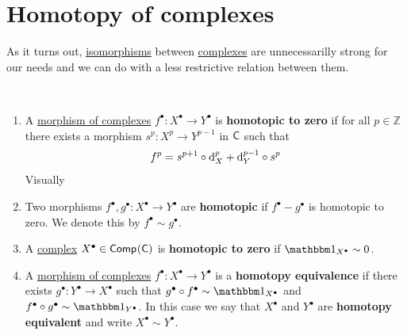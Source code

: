 \documentclass[../../main]{subfiles}
\begin{document}
\section{Homotopy of complexes}

As it turns out, \hyperref[def:categorical-isomorphism]{isomorphisms} between \hyperref[def:complex]{complexes} are unnecessarilly strong for our needs and we can do with a less restrictive relation between them.
\begin{definition}[Homotopy]\label{def:homotopy}~
  \begin{enumerate}
    \item A \hyperref[def:complex]{morphism of complexes} \(f^{\bullet}\colon X^{\bullet} \to Y^{\bullet}\) is \textbf{homotopic to zero} if for all \(p \in \mathbb{Z}\) there exists a morphism \(s^{p}\colon X^{p} \to Y^{p-1}\) in \(\mathsf{C}\) such that
          \begin{equation*}
            f^{p} = s^{p+1} \circ \mathrm{d}_{X}^{p} + \mathrm{d}_{Y}^{p-1} \circ s^{p}
          \end{equation*}
          Visually
          \begin{center}
          \end{center}
    \item Two morphisms \(f^{\bullet}, g^{\bullet}\colon X^{\bullet} \to Y^{\bullet}\) are \textbf{homotopic} if \(f^{\bullet}-g^{\bullet}\) is homotopic to zero.
          We denote this by \(f^{\bullet} \sim g^{\bullet}\).
    \item A \hyperref[def:complex]{complex} \(X^{\bullet} \in \mathsf{Comp}^{}(\mathsf{C})\) is \textbf{homotopic to zero} if \(\id_{X^{\bullet}} \sim 0\).
    \item A \hyperref[def:complex]{morphism of complexes} \(f^{\bullet}\colon X^{\bullet} \to Y^{\bullet}\) is a \textbf{homotopy equivalence} if there exists \(g^{\bullet}\colon Y^{\bullet} \to X^{\bullet}\) such that \(g^{\bullet} \circ f^{\bullet} \sim \id_{X^{\bullet}}\)  and \(f^{\bullet} \circ g^{\bullet} \sim \id_{Y^{\bullet}}\).
          In this case we say that \(X^{\bullet}\) and \(Y^{\bullet}\) are \textbf{homotopy equivalent} and write \(X^{\bullet} \sim Y^{\bullet}\).
  \end{enumerate}
\end{definition}
\end{document}
